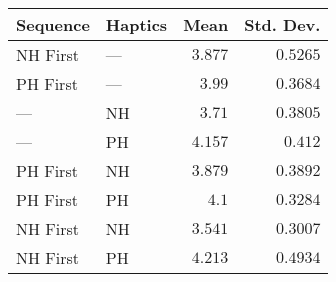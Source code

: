 \begin{tabular}{llrr}
\toprule
 Sequence & Haptics &    Mean &  Std. Dev. \\
\midrule
 NH First &     --- & $3.877$ &   $0.5265$ \\
 PH First &     --- &  $3.99$ &   $0.3684$ \\
      --- &      NH &  $3.71$ &   $0.3805$ \\
      --- &      PH & $4.157$ &    $0.412$ \\
 PH First &      NH & $3.879$ &   $0.3892$ \\
 PH First &      PH &   $4.1$ &   $0.3284$ \\
 NH First &      NH & $3.541$ &   $0.3007$ \\
 NH First &      PH & $4.213$ &   $0.4934$ \\
\bottomrule
\end{tabular}

